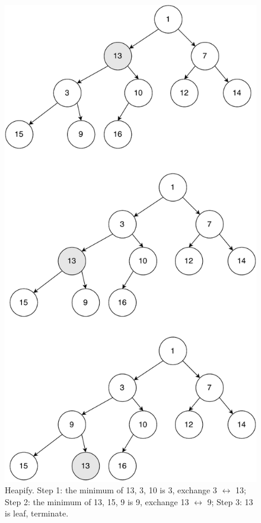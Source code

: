 \documentclass[b5paper]{article}
\begin{document}
\begin{figure}[htbp]
  \centering
  \includegraphics[scale=0.4]{img/heapify}
  \caption{Heapify. Step 1: the minimum of 13, 3, 10 is 3, exchange 3 $\leftrightarrow$ 13; Step 2: the minimum of 13, 15, 9 is 9, exchange 13 $\leftrightarrow$ 9; Step 3: 13 is leaf, terminate.}
  \label{fig:heapify}
\end{figure}
\end{document}
